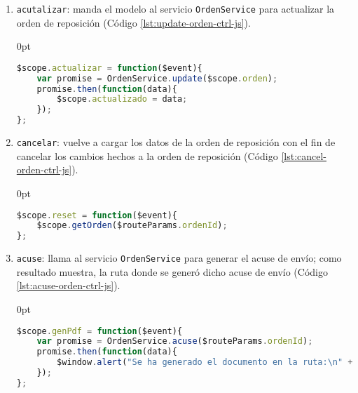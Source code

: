 \begin{enumerate}
\begin{enumerate}
	\item \texttt{acutalizar}: manda el modelo al servicio \texttt{OrdenService} para actualizar la orden de reposición (Código \ref{lst:update-orden-ctrl-js}).
\begin{adjustwidth}{\listingfixlargewidth}{0pt}
\begin{lstlisting}[language=Javascript, caption={Función del controlador de \textit{AngularJS} para actualizar una orden de reposición.}, captionpos=b, label={lst:update-orden-ctrl-js}]
$scope.actualizar = function($event){
	var promise = OrdenService.update($scope.orden);
	promise.then(function(data){
		$scope.actualizado = data;
	});
};
\end{lstlisting}
\end{adjustwidth}

	\item \texttt{cancelar}: vuelve a cargar los datos de la orden de reposición con el fin de cancelar los cambios hechos a la orden de reposición (Código \ref{lst:cancel-orden-ctrl-js}).
\begin{adjustwidth}{\listingfixlargewidth}{0pt}
\begin{lstlisting}[language=Javascript, caption={Función del controlador de \textit{AngularJS} para cancelar los cambios en una orden de reposición.}, captionpos=b, label={lst:cancel-orden-ctrl-js}]
$scope.reset = function($event){
	$scope.getOrden($routeParams.ordenId);
};
\end{lstlisting}
\end{adjustwidth}

\pagebreak

	\item \texttt{acuse}: llama al servicio \texttt{OrdenService} para generar el acuse de envío; como resultado muestra, la ruta donde se generó dicho acuse de envío (Código \ref{lst:acuse-orden-ctrl-js}).
\begin{adjustwidth}{\listingfixlargewidth}{0pt}
\begin{lstlisting}[language=Javascript, caption={Función del controlador de \textit{AngularJS} para generar el acuse de envío de la orden de reposición.}, captionpos=b, label={lst:acuse-orden-ctrl-js}]
$scope.genPdf = function($event){
	var promise = OrdenService.acuse($routeParams.ordenId);
	promise.then(function(data){
		$window.alert("Se ha generado el documento en la ruta:\n" + data);
	});
};
\end{lstlisting}
\end{adjustwidth}


\end{enumerate}
\end{enumerate}
